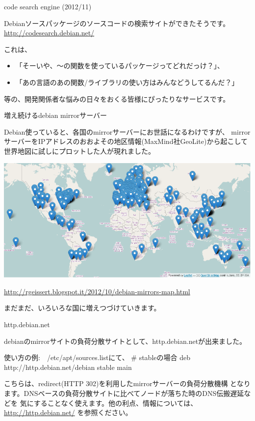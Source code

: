 \begin{frame}{code search engine (2012/11)}

Debianソースパッケージのソースコードの検索サイトができたそうです。\\
\url{http://codesearch.debian.net/}

これは、
\begin{itemize}
\item 「そーいや、〜の関数を使っているパッケージってどれだっけ？」、
\item 「あの言語のあの関数/ライブラリの使い方はみんなどうしてるんだ？」
\end{itemize}
等の、開発関係者な悩みの日々をおくる皆様にぴったりなサービスです。

\end{frame}

\begin{frame}{増え続けるdebian mirrorサーバー}

 Debian使っていると、各国のmirrorサーバーにお世話になるわけですが、
mirrorサーバーをIPアドレスのおおよその地区情報(MaxMind社GeoLite)から起こして
世界地図に試しにプロットした人が現れました。\\
\begin{center}
\includegraphics[width=0.8\hsize]{image201302/osc-tokyo/mirrors-map.png}
\end{center}
\url{http://rgeissert.blogspot.it/2012/10/debian-mirrors-map.html}\\
\begin{center}
まだまだ、いろいろな国に増えつづけていきます。
\end{center}
\end{frame}

\begin{frame}[containsverbatim]{http.debian.net}

 debianのmirrorサイトの負荷分散サイトとして、http.debian.netが出来ました。

\begin{commandline}
使い方の例:　/etc/apt/sources.listにて、
# stableの場合
deb http://http.debian.net/debian stable main
\end{commandline}

 こちらは、redirect(HTTP 302)を利用したmirrorサーバーの負荷分散機構
となります。DNSベースの負荷分散サイトに比べてノードが落ちた時のDNS伝搬遅延などを
気にすることなく使えます。他の利点、情報については、\\
\url{http://http.debian.net/}
を参照ください。

\end{frame}

